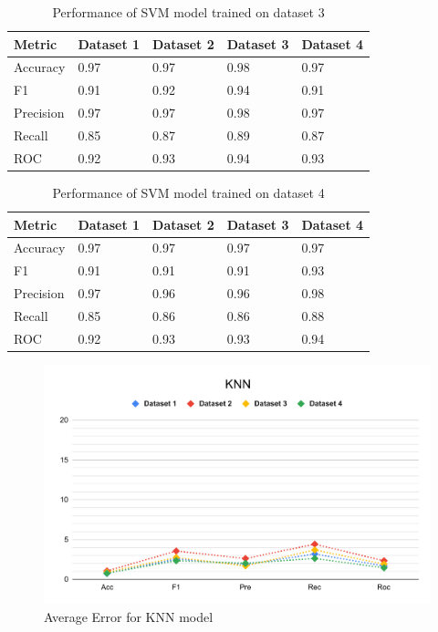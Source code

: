 \begin{table}[hbt]
\caption{Performance of SVM model trained on dataset 3}\label{tab:performance_of_svm_model_trained_on_dataset_3}
\begin{tabular*}{\tblwidth}{@{}LLLLL@{}}
\toprule
    Metric & Dataset 1 & Dataset 2 & Dataset 3 & Dataset 4 \\
\midrule
    Accuracy & 0.97 & 0.97 & 0.98 & 0.97 \\
    F1 & 0.91 & 0.92 & 0.94 & 0.91 \\
    Precision & 0.97 & 0.97 & 0.98 & 0.97 \\
    Recall & 0.85 & 0.87 & 0.89 & 0.87 \\
    ROC & 0.92 & 0.93 & 0.94 & 0.93 \\
\bottomrule
\end{tabular*}
\end{table}

\begin{table}[hbt]
\caption{Performance of SVM model trained on dataset 4}\label{tab:performance_of_svm_model_trained_on_dataset_4}
\begin{tabular*}{\tblwidth}{@{}LLLLL@{}}
\toprule
    Metric & Dataset 1 & Dataset 2 & Dataset 3 & Dataset 4 \\
\midrule
    Accuracy & 0.97 & 0.97 & 0.97 & 0.97 \\
    F1 & 0.91 & 0.91 & 0.91 & 0.93 \\
    Precision & 0.97 & 0.96 & 0.96 & 0.98 \\
    Recall & 0.85 & 0.86 & 0.86 & 0.88 \\
    ROC & 0.92 & 0.93 & 0.93 & 0.94 \\
\bottomrule
\end{tabular*}
\end{table}

\begin{figure}[btp]
    \centering
    \includegraphics[width=0.9\columnwidth]{media/results/delta_KNN.pdf}
    \caption{Average Error for KNN model} \label{fig:perfromance_delta_knn}
\end{figure}

